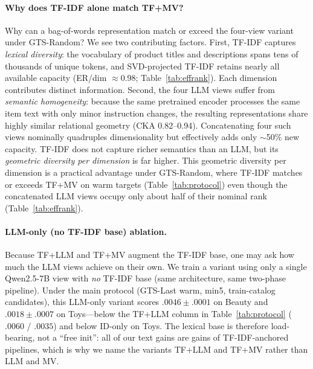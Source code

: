 \documentclass[sigconf,natbib=true,anonymous]{acmart}
\newcommand{\tfidf}{\textsc{TF-IDF}\xspace}
\newcommand{\tfllm}{\textsc{TF+LLM}\xspace}
\newcommand{\tfmv}{\textsc{TF+MV}\xspace}
\begin{document}
\paragraph{Why does TF-IDF alone match \tfmv?}
Why can a bag-of-words representation match or exceed the four-view variant under GTS-Random?
We see two contributing factors.
First, \tfidf captures \emph{lexical diversity}: the vocabulary of product titles and descriptions spans tens of thousands of unique tokens, and SVD-projected TF-IDF retains nearly all available capacity (ER/dim $\approx$0.98; Table~\ref{tab:effrank}).
Each dimension contributes distinct information.
Second, the four LLM views suffer from \emph{semantic homogeneity}: because the same pretrained encoder processes the same item text with only minor instruction changes, the resulting representations share highly similar relational geometry (CKA 0.82--0.94).
Concatenating four such views nominally quadruples dimensionality but effectively adds only $\sim$50\% new capacity.
TF-IDF does not capture richer semantics than an LLM, but its \emph{geometric diversity per dimension} is far higher.
This geometric diversity per dimension is a practical advantage under GTS-Random, where \tfidf matches or exceeds \tfmv on warm targets (Table~\ref{tab:protocol}) even though the concatenated LLM views occupy only about half of their nominal rank (Table~\ref{tab:effrank}).

\paragraph{LLM-only (no \tfidf base) ablation.}
Because \tfllm and \tfmv augment the \tfidf base, one may ask how much the LLM views achieve on their own.
We train a variant using only a single Qwen2.5-7B view with \emph{no} \tfidf base (same architecture, same two-phase pipeline).
Under the main protocol (GTS-Last warm, min5, train-catalog candidates), this LLM-only variant scores $.0046\pm.0001$ on Beauty and $.0018\pm.0007$ on Toys---below the \tfllm column in Table~\ref{tab:protocol} ($.0060$ / $.0035$) and below ID-only on Toys.
The lexical base is therefore load-bearing, not a ``free init'': all of our text gains are gains of \tfidf-anchored pipelines, which is why we name the variants \tfllm and \tfmv rather than LLM and MV.
\end{document}
